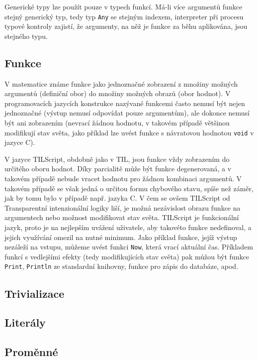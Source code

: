 Generické typy lze použít pouze v typech funkcí. Má-li více argumentů funkce stejný generický
typ, tedy typ \lstinline{Any} se stejným indexem, interpreter při procesu typové kontroly zajistí,
že argumenty, na něž je funkce za běhu aplikována, jsou stejného typu.

\subsection{Funkce}

V matematice známe funkce jako jednoznačné zobrazení z množiny možných argumentů (definiční obor)
do množiny možných obrazů (obor hodnot). V programovacích jazycích konstrukce nazývané funkcemi
často nemusí být nejen jednoznačné (výstup nemusí odpovídat pouze argumentům), ale dokonce nemusí
být ani zobrazením (nevrací žádnou hodnotu, v takovém případě většinou modifikují stav světa,
jako příklad lze uvést funkce s návratovou hodnotou \lstinline{void} v jazyce C).

V jazyce TILScript, obdobně jako v TIL, jsou funkce vždy zobrazením do určitého oboru hodnot. Díky
parcialitě může být funkce degenerovaná, a v takovém případě nebude vracet hodnotu pro žádnou
kombinaci argumentů. V takovém případě se však jedná o určitou formu chybového stavu, spíše než
záměr, jak by tomu bylo v případě např. jazyka C. V čem se ovšem TILScript od Transparentní
intenzionální logiky liší, je možná nezávislost obrazu funkce na argumentech nebo možnost
modifikovat stav světa. TILScript je funkcionální jazyk, proto je na nejlepším uvážení uživatele,
aby takovéto funkce nedefinoval, a jejich využívání omezil na nutné minimum. Jako příklad funkce,
jejíž výstup nezáleží na vstupu, můžeme uvést funkci \lstinline{Now}, která vrací aktuální čas.
Příkladem funkcí s vedlejšími efekty (tedy modifikujících stav světa) pak můžou být funkce
\lstinline{Print}, \lstinline{Println} ze standardní knihovny, funkce pro zápis do databáze, apod.


\subsection{Trivializace}

\subsection{Literály}

\subsection{Proměnné}

